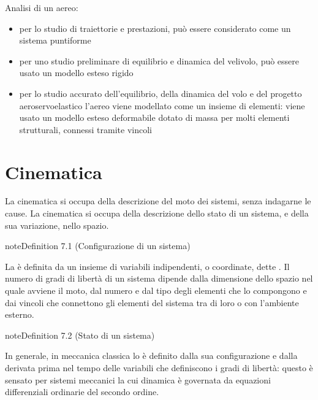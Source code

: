 \documentclass[letterpaper,10pt,italian]{jupyterBook}
\begin{document}
\sphinxAtStartPar
{} Analisi di un aereo:
\begin{itemize}
\item {} 
\sphinxAtStartPar
per lo studio di traiettorie e prestazioni, può essere considerato come un sistema puntiforme

\item {} 
\sphinxAtStartPar
per uno studio preliminare di equilibrio e dinamica del velivolo, può essere usato un modello esteso rigido

\item {} 
\sphinxAtStartPar
per lo studio accurato dell’equilibrio, della dinamica del volo e del progetto aero\sphinxhyphen{}servo\sphinxhyphen{}elastico l’aereo viene modellato come un insieme di elementi: viene usato un modello esteso deformabile dotato di massa per molti elementi strutturali, connessi tramite vincoli

\end{itemize}

\sphinxstepscope




\chapter{Cinematica}
\label{\detokenize{ch/mechanics/kinematics:cinematica}}\label{\detokenize{ch/mechanics/kinematics:physics-hs-mechanics-kinematics}}\label{\detokenize{ch/mechanics/kinematics::doc}}
\sphinxAtStartPar
La cinematica si occupa della descrizione del moto dei sistemi, senza indagarne le cause. La cinematica si occupa della descrizione dello stato di un sistema, e della sua variazione, nello spazio.
\label{ch/mechanics/kinematics:system-configuration}
\begin{sphinxadmonition}{note}{Definition 7.1 (Configurazione di un sistema)}



\sphinxAtStartPar
La  è definita da un insieme di variabili indipendenti, o coordinate, dette .  Il numero di gradi di libertà di un sistema dipende dalla dimensione dello spazio nel quale avviene il moto, dal numero e dal tipo degli elementi che lo compongono e dai vincoli che connettono gli elementi del sistema tra di loro o con l’ambiente esterno.
\end{sphinxadmonition}
\label{ch/mechanics/kinematics:system-state}
\begin{sphinxadmonition}{note}{Definition 7.2 (Stato di un sistema)}



\sphinxAtStartPar
In generale, in meccanica classica lo  è definito dalla sua configurazione e dalla derivata prima nel tempo delle variabili che definiscono i gradi di libertà: questo è sensato per sistemi meccanici la cui dinamica è governata da equazioni differenziali ordinarie del secondo ordine.
\end{sphinxadmonition}
\end{document}
